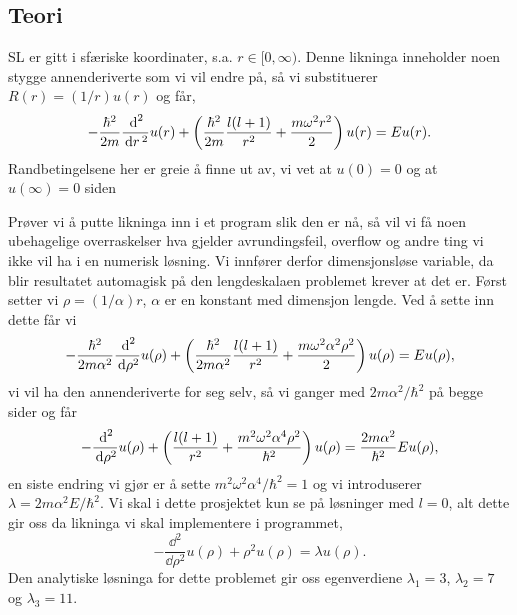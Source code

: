 \documentclass[norsk, 11pt]{article}
\begin{document}
\subsection*{Teori}
SL er gitt i sfæriske koordinater, s.a. $r\in [0,\infty)$. Denne likninga inneholder noen stygge annenderiverte som vi vil endre på, så vi substituerer $R(r) = (1/r)u(r)$ og får,
$$ -\frac{\hbar^2}{2m}\frac{\, {\text d}^2}{\, {\rm d}r\,^2}u(r) + \left( \frac{\hbar^2}{2m}\frac{l(l+1)}{r^2} + \frac{m\omega^2r^2}{2} \right) u(r) = E u(r).$$
Randbetingelsene her er greie å finne ut av, vi vet at $u(0) = 0$ og at $u(\infty) = 0$ siden 

Prøver vi å putte likninga inn i et program slik den er nå, så vil vi få noen ubehagelige overraskelser hva gjelder avrundingsfeil, overflow og andre ting vi ikke vil ha i en numerisk løsning. Vi innfører derfor dimensjonsløse variable, da blir resultatet automagisk på den lengdeskalaen problemet krever at det er. Først setter vi $ \rho = (1/ \alpha)r$, $\alpha$ er en konstant med dimensjon lengde. Ved å sette inn dette får vi
$$ -\frac{\hbar^2}{2m\alpha^2}\frac{\, {\text d}^2}{\, {\text d}\rho^2}u(\rho) + \left( \frac{\hbar^2}{2m\alpha^2}\frac{l(l+1)}{r^2} + \frac{m\omega^2\alpha^2\rho^2}{2} \right) u(\rho) = E u(\rho), $$
vi vil ha den annenderiverte for seg selv, så vi ganger med $2m\alpha^2/\hbar^2$ på begge sider og får
$$ -\frac{\, {\text d}^2}{\, {\text d}\rho^2}u(\rho) + \left( \frac{l(l+1)}{r^2} + \frac{m^2\omega^2\alpha^4\rho^2}{\hbar^2} \right) u(\rho) = \frac{2m\alpha^2}{\hbar^2}E u(\rho), $$
en siste endring vi gjør er å sette $m^2\omega^2\alpha^4/\hbar^2=1$ og vi introduserer $ \lambda = 2m\alpha^2 E/ \hbar^2$. Vi skal i dette prosjektet kun se på løsninger med $l=0$, alt dette gir oss da likninga vi skal implementere i programmet,
$$ -\frac{\dd^2}{\dd\rho^2}u(\rho) + \rho^2u(\rho) = \lambda u(\rho). $$
Den analytiske løsninga for dette problemet gir oss egenverdiene $\lambda_1 = 3$, $\lambda_2 = 7$ og $\lambda_3 = 11$.
\end{document}
